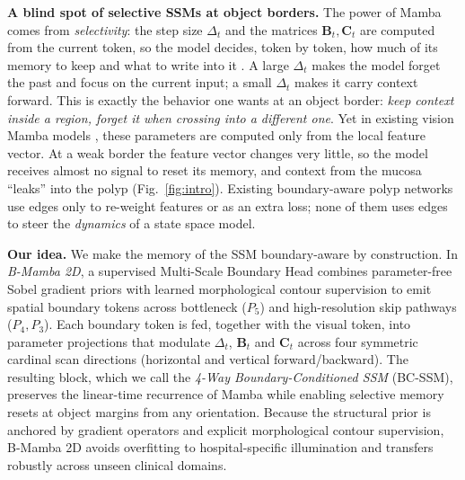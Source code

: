 \documentclass[journal]{IEEEtran}
\newcommand{\vect}[1]{\bm{#1}}
\newcommand{\Dt}{\Delta}
\begin{document}
\textbf{A blind spot of selective SSMs at object borders.} The power of Mamba comes from \emph{selectivity}: the step size $\Dt_t$ and the matrices $\vect{B}_t,\vect{C}_t$ are computed from the current token, so the model decides, token by token, how much of its memory to keep and what to write into it \cite{gu2023mamba}. A large $\Dt_t$ makes the model forget the past and focus on the current input; a small $\Dt_t$ makes it carry context forward. This is exactly the behavior one wants at an object border: \emph{keep context inside a region, forget it when crossing into a different one}. Yet in existing vision Mamba models \cite{zhu2024vim,liu2024vmamba,ma2024umamba,ruan2024vmunet}, these parameters are computed only from the local feature vector. At a weak border the feature vector changes very little, so the model receives almost no signal to reset its memory, and context from the mucosa ``leaks'' into the polyp (Fig.~\ref{fig:intro}). Existing boundary-aware polyp networks \cite{fang2019sfa,fan2020pranet,bui2024meganet} use edges only to re-weight features or as an extra loss; none of them uses edges to steer the \emph{dynamics} of a state space model.

\textbf{Our idea.} We make the memory of the SSM boundary-aware by construction. In \emph{B-Mamba 2D}, a supervised Multi-Scale Boundary Head combines parameter-free Sobel gradient priors with learned morphological contour supervision to emit spatial boundary tokens across bottleneck ($P_5$) and high-resolution skip pathways ($P_4, P_3$). Each boundary token is fed, together with the visual token, into parameter projections that modulate $\Dt_t$, $\vect{B}_t$ and $\vect{C}_t$ across four symmetric cardinal scan directions (horizontal and vertical forward/backward). The resulting block, which we call the \emph{4-Way Boundary-Conditioned SSM} (BC-SSM), preserves the linear-time recurrence of Mamba while enabling selective memory resets at object margins from any orientation. Because the structural prior is anchored by gradient operators and explicit morphological contour supervision, B-Mamba 2D avoids overfitting to hospital-specific illumination and transfers robustly across unseen clinical domains.
\end{document}
